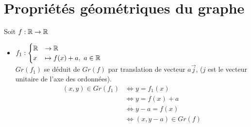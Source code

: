 \section{Propriétés géométriques du graphe}
\noindent Soit $f:\mathbb{R} \to \mathbb{R}$
\begin{itemize}
	\item 
	$
	f_1 : 
	\begin{cases}
		\mathbb{R} &\to \mathbb{R} \\
		x &\mapsto f(x) + a,\ a \in \mathbb{R}
	\end{cases}
	$
	\\
	$Gr(f_1)$ se déduit de $Gr(f)$ par translation de vecteur $a \Vec{j}$, ($j$ est le vecteur unitaire de l'axe des ordonnées). 
	\begin{align*}
		(x,y) \in Gr(f_1) &\iff y = f_1(x) \\
		&\iff y = f(x) + a \\
		&\iff y - a = f(x) \\
		&\iff (x, y - a) \in Gr(f)
	\end{align*}        
	\begin{figure}[h!]
		\centering
	\end{figure}
	

\end{itemize}
